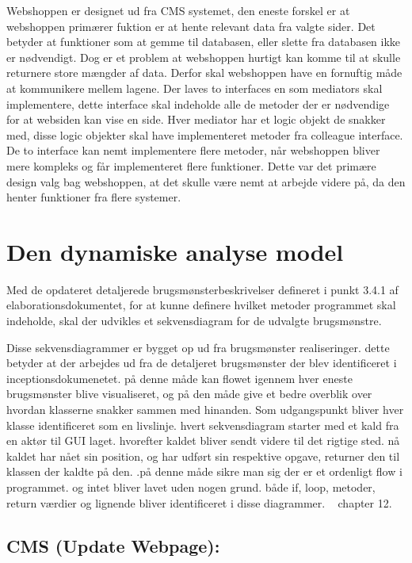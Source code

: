Webshoppen er designet ud fra CMS systemet, den eneste forskel er at webshoppen primærer fuktion er at hente relevant data fra valgte sider. Det betyder at funktioner som at gemme til databasen, eller slette fra databasen ikke er nødvendigt. Dog er et problem at webshoppen hurtigt kan komme til at skulle returnere store mængder af data. Derfor skal webshoppen have en fornuftig måde at kommunikere mellem lagene. Der laves to interfaces  en som mediators skal implementere, dette interface skal indeholde alle de metoder der er nødvendige for at websiden kan vise en side. Hver mediator har et logic objekt de snakker med, disse logic objekter skal have implementeret metoder fra colleague interface. De to interface kan nemt implementere flere metoder, når webshoppen bliver mere kompleks og får implementeret flere funktioner. Dette var det primære design valg bag webshoppen, at det skulle være nemt at arbejde videre på, da den henter funktioner fra flere systemer.

\section{Den dynamiske analyse model}
Med de opdateret detaljerede brugsmønsterbeskrivelser defineret i punkt 3.4.1 af elaborationsdokumentet, for at kunne definere hvilket metoder programmet skal indeholde, skal der udvikles et sekvensdiagram for de udvalgte brugsmønstre. 

Disse sekvensdiagrammer er bygget op ud fra brugsmønster realiseringer. dette betyder at der arbejdes ud fra de detaljeret brugsmønster der blev identificeret i inceptionsdokumenetet. på denne måde kan flowet igennem hver eneste brugsmønster blive visualiseret, og på den måde give et bedre overblik over hvordan klasserne snakker sammen med hinanden. Som udgangspunkt bliver hver klasse identificeret som en livslinje. hvert sekvensdiagram starter med et kald fra en aktør til GUI laget. hvorefter kaldet bliver sendt videre til det rigtige sted. nå kaldet har nået sin position, og har udført sin respektive opgave, returner den til klassen der kaldte på den. .på denne måde sikre man sig der er et ordenligt flow i programmet. og intet bliver lavet uden nogen grund. både if, loop, metoder, return værdier og lignende bliver identificeret i disse diagrammer. 
~\cite{A&N} chapter 12.

\subsection{CMS (Update Webpage):}


